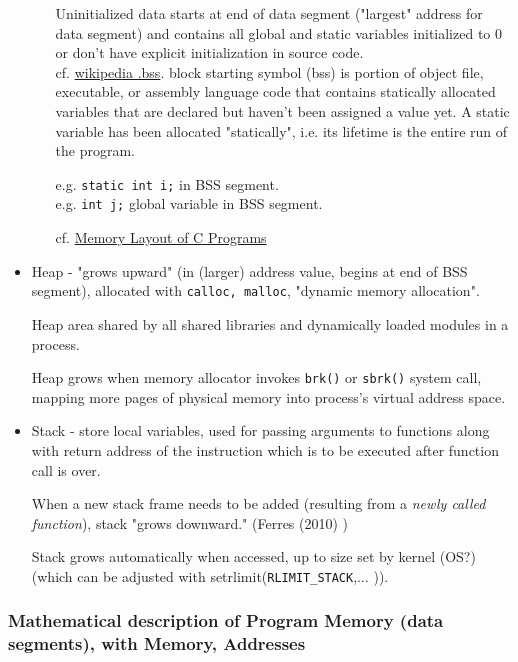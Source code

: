 \documentclass[10pt]{amsart}
\begin{document}
\begin{multicols*}{2}
\begin{itemize}
\begin{itemize}
		Uninitialized data starts at end of data segment ("largest" address for data segment) and contains all global and static variables initialized to 0 or don't have explicit initialization in source code.  \\

		cf. \href{https://en.wikipedia.org/wiki/.bss}{wikipedia .bss}. block starting symbol (bss) is portion of object file, executable, or assembly language code that contains statically allocated variables that are declared but haven't been assigned a value yet. A static variable has been allocated "statically", i.e. its lifetime is the entire run of the program.
		
		e.g. \verb|static int i;| in BSS segment.  \\
		e.g. \verb|int j;| global variable in BSS segment. 	
		
		  cf. \href{http://www.geeksforgeeks.org/memory-layout-of-c-program/}{Memory Layout of C Programs}  
			
	\end{itemize}
	\item Heap - "grows upward" (in (larger) address value, begins at end of BSS segment), allocated with \verb|calloc, malloc|, "dynamic memory allocation".    
	
	Heap area shared by all shared libraries and dynamically loaded modules in a process.  
	
	Heap grows when memory allocator invokes \verb|brk()| or \verb|sbrk()| system call, mapping more pages of physical memory into process's virtual address space.  
	
	\item Stack - store local variables, used for passing arguments to functions along with return address of the instruction which is to be executed after function call is over.  
	
	When a new stack frame needs to be added (resulting from a \emph{newly called function}), stack "grows downward."  (Ferres (2010) \cite{Ferr2010})  
	
	Stack grows automatically when accessed, up to size set by kernel (OS?) (which can be adjusted with setrlimit(\verb|RLIMIT_STACK|,$\ldots$ )).  \\
	\end{itemize}

\subsubsection{Mathematical description of Program Memory (data segments), with \textbf{Memory}, \textbf{Addresses}}  


\end{multicols*}
\end{document}
